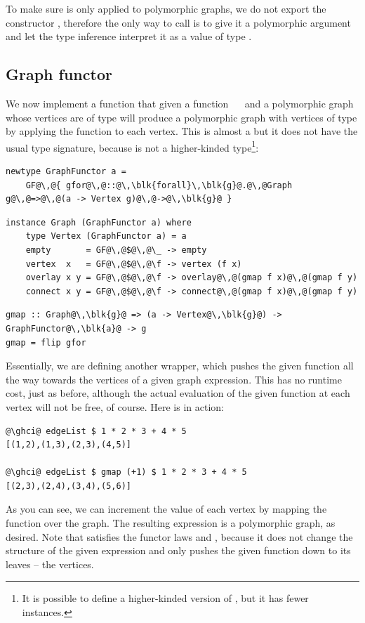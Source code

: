 To make sure  is only applied to polymorphic graphs, we do not export
the constructor , therefore the only way to call  is to give it a
polymorphic argument and let the type inference interpret it as a value of type
.

\subsection{Graph functor}\label{sub-functor}

We now implement a function  that given a function ~\hs{->}~
and a polymorphic graph whose vertices are of type  will produce a
polymorphic graph with vertices of type  by applying the function
to each vertex. This is almost a  but it does not have the usual
type signature, because  is not a higher-kinded type\footnote{It is
possible to define a higher-kinded version of , but it has
fewer instances.}:

\vspace{2mm}
\begin{verbatim}
newtype GraphFunctor a =
    GF@\,@{ gfor@\,@::@\,\blk{forall}\,\blk{g}@.@\,@Graph g@\,@=>@\,@(a -> Vertex g)@\,@->@\,\blk{g}@ }
\end{verbatim}
\vspace{1mm}
\begin{verbatim}
instance Graph (GraphFunctor a) where
    type Vertex (GraphFunctor a) = a
    empty       = GF@\,@$@\,@\_ -> empty
    vertex  x   = GF@\,@$@\,@\f -> vertex (f x)
    overlay x y = GF@\,@$@\,@\f -> overlay@\,@(gmap f x)@\,@(gmap f y)
    connect x y = GF@\,@$@\,@\f -> connect@\,@(gmap f x)@\,@(gmap f y)
\end{verbatim}
\vspace{1mm}
\begin{verbatim}
gmap :: Graph@\,\blk{g}@ => (a -> Vertex@\,\blk{g}@) -> GraphFunctor@\,\blk{a}@ -> g
gmap = flip gfor
\end{verbatim}

Essentially, we are defining another  wrapper, which pushes the
given function all the way towards the vertices of a given graph expression.
This has no runtime cost,
just as before, although the actual evaluation of the given function at each
vertex will not be free, of course. Here is  in action:

\begin{verbatim}
@\ghci@ edgeList $ 1 * 2 * 3 + 4 * 5
[(1,2),(1,3),(2,3),(4,5)]

@\ghci@ edgeList $ gmap (+1) $ 1 * 2 * 3 + 4 * 5
[(2,3),(2,4),(3,4),(5,6)]
\end{verbatim}
\vspace{-1mm}
As you can see, we can increment the value of each vertex by mapping the function
 over the graph. The resulting expression is a polymorphic graph, as desired.
Note that  satisfies the functor laws
 and , because
it does not change the structure of the given expression and only pushes
the given function down to its leaves -- the vertices.

